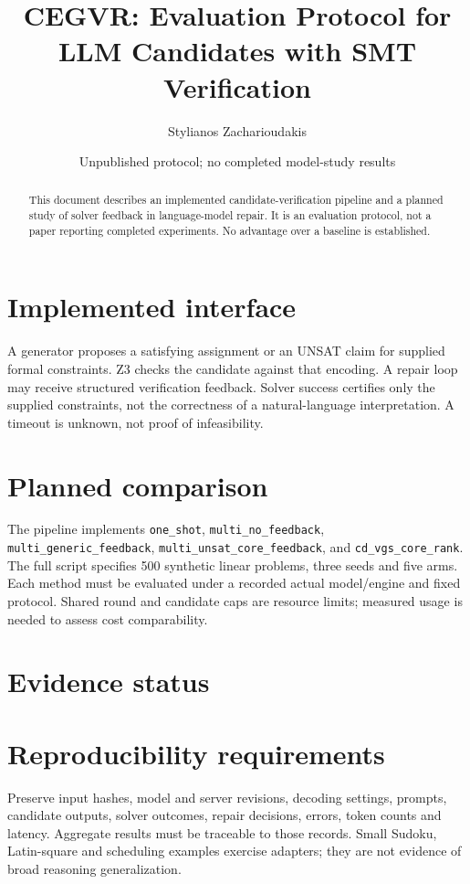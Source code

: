 \documentclass[10pt]{article}
\title{CEGVR: Evaluation Protocol for LLM Candidates with SMT Verification}
\author{Stylianos Zacharioudakis}
\date{Unpublished protocol; no completed model-study results}
\begin{document}
\maketitle
\begin{abstract}
This document describes an implemented candidate-verification pipeline and a
planned study of solver feedback in language-model repair. It is an evaluation
protocol, not a paper reporting completed experiments. No advantage over a
baseline is established.
\end{abstract}
\section{Implemented interface}
A generator proposes a satisfying assignment or an UNSAT claim for supplied
formal constraints. Z3 checks the candidate against that encoding. A repair
loop may receive structured verification feedback. Solver success certifies
only the supplied constraints, not the correctness of a natural-language
interpretation. A timeout is unknown, not proof of infeasibility.
\section{Planned comparison}
The pipeline implements \texttt{one\_shot}, \texttt{multi\_no\_feedback},
\texttt{multi\_generic\_feedback}, \texttt{multi\_unsat\_core\_feedback}, and
\texttt{cd\_vgs\_core\_rank}. The full script specifies 500 synthetic linear
problems, three seeds and five arms. Each method must be evaluated under a
recorded actual model/engine and fixed protocol. Shared round and candidate
caps are resource limits; measured usage is needed to assess cost comparability.
\section{Evidence status}

\section{Reproducibility requirements}
Preserve input hashes, model and server revisions, decoding settings, prompts,
candidate outputs, solver outcomes, repair decisions, errors, token counts and
latency. Aggregate results must be traceable to those records. Small Sudoku,
Latin-square and scheduling examples exercise adapters; they are not evidence
of broad reasoning generalization.
\end{document}
